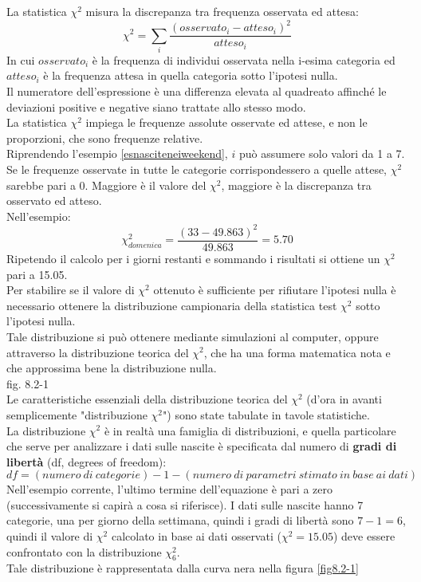 \documentclass[drafts, 10pt]{book}
\begin{document}
La statistica $\chi^2$ misura la discrepanza tra frequenza osservata ed attesa:
\begin{equation}
\chi^2 = \sum_i \frac{(osservato_i - atteso_i)^2}{atteso_i}
\end{equation}
In cui $osservato_i$ è la frequenza di individui osservata nella i-esima categoria ed $atteso_i$ è la frequenza attesa in quella categoria sotto l'ipotesi nulla.
\\
Il numeratore dell'espressione è una differenza elevata al quadreato affinché le deviazioni positive e negative siano trattate allo stesso modo.
\\
La statistica $\chi^2$ impiega le frequenze assolute osservate ed attese, e non le proporzioni, che sono frequenze relative.
\\
Riprendendo l'esempio \ref{esnasciteneiweekend}, $i$ può assumere solo valori da 1 a 7. Se le frequenze osservate in tutte le categorie corrispondessero a quelle attese, $\chi^2$ sarebbe pari a 0. Maggiore è il valore del $\chi^2$, maggiore è la discrepanza tra osservato ed atteso.
\\
Nell'esempio:
\begin{equation}
\chi^2_{domenica} = \frac{(33 - 49.863)^2}{49.863} = 5.70
\end{equation}
Ripetendo il calcolo per i giorni restanti e sommando i risultati si ottiene un $\chi^2$ pari a 15.05.
\\
Per stabilire se il valore di $\chi^2$ ottenuto è sufficiente per rifiutare l'ipotesi nulla è necessario ottenere la distribuzione campionaria della statistica test $\chi^2$ sotto l'ipotesi nulla.
\\
Tale distribuzione si può ottenere mediante simulazioni al computer, oppure attraverso la distribuzione teorica del $\chi^2$, che ha una forma matematica nota e che approssima bene la distribuzione nulla.
\\
fig. 8.2-1 \label{fig8.2-1} %
\\
Le caratteristiche essenziali della distribuzione teorica del $\chi^2$ (d'ora in avanti semplicemente "distribuzione $\chi^2$") sono state tabulate in tavole statistiche. %
\\
La distribuzione $\chi^2$ è in realtà una famiglia di distribuzioni, e quella particolare che serve per analizzare i dati sulle nascite è specificata dal numero di \textbf{gradi di libertà} (df, degrees of freedom):
\begin{equation}
df = (numero\ di\ categorie) -1 - (numero\ di\ parametri\ stimato\ in\ base\ ai\ dati)
\end{equation}
Nell'esempio corrente, l'ultimo termine dell'equazione è pari a zero (successivamente si capirà a cosa si riferisce). I dati sulle nascite hanno 7 categorie, una per giorno della settimana, quindi i gradi di libertà sono $7-1 = 6$, quindi il valore di $\chi^2$ calcolato in base ai dati osservati ($\chi^2 = 15.05$) deve essere confrontato con la distribuzione $\chi^2_6$.
\\
Tale distribuzione è rappresentata dalla curva nera nella figura \ref{fig8.2-1}
\end{document}
